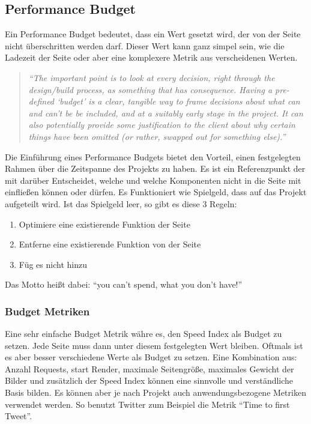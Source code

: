 	



		\subsection{Performance Budget} %
		\label{sub:performance_budget}
			Ein Performance Budget bedeutet, dass ein Wert gesetzt wird, der von der Seite nicht überschritten werden darf. Dieser Wert kann ganz simpel sein, wie die Ladezeit der Seite oder aber eine komplexere Metrik aus verscheidenen Werten.

			\begin{quote}
				\textit{"`The important point is to look at every decision, right through the design/build process, as something that has consequence. Having a pre-defined ‘budget’ is a clear, tangible way to frame decisions about what can and can’t be be included, and at a suitably early stage in the project. It can also potentially provide some justification to the client about why certain things have been omitted (or rather, swapped out for something else)."'}
			\end{quote}

			Die Einführung eines Performance Budgets bietet den Vorteil, einen festgelegten Rahmen über die Zeitspanne des Projekts zu haben. Es ist ein Referenzpunkt der mit darüber Entscheidet, welche und welche Komponenten nicht in die Seite mit einfließen können oder dürfen. Es Funktioniert wie Spielgeld, dass auf das Projekt aufgeteilt wird. Ist das Spielgeld leer, so gibt es diese 3 Regeln:
			\begin{enumerate}
				\item Optimiere eine existierende Funktion der Seite
				\item Entferne eine existierende Funktion von der Seite
				\item Füg es nicht hinzu
			\end{enumerate}
			Das Motto heißt dabei: "`you can't spend, what you don't have!"'

			\subsubsection{Budget Metriken} %
			\label{ssub:Budget_metriken}
				
				Eine sehr einfache Budget Metrik währe es, den Speed Index als Budget zu setzen. Jede Seite muss dann unter diesem festgelegten Wert bleiben. Oftmals ist es aber besser verschiedene Werte als Budget zu setzen. Eine Kombination aus: Anzahl Requests, start Render, maximale Seitengröße, maximales Gewicht der Bilder und zusätzlich der Speed Index können eine sinnvolle und verständliche Basis bilden. Es können aber je nach Projekt auch anwendungsbezogene Metriken verwendet werden. So benutzt Twitter zum Beispiel die Metrik "`Time to first Tweet"'.

